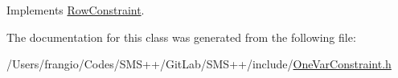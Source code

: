 Implements \mbox{\hyperlink{class_s_m_spp__di__unipi__it_1_1_row_constraint_a1e707449bc5e308a84fbb17197e184a6}{Row\+Constraint}}.



The documentation for this class was generated from the following file\+:\begin{DoxyCompactItemize}
\item 
/\+Users/frangio/\+Codes/\+S\+M\+S++/\+Git\+Lab/\+S\+M\+S++/include/\mbox{\hyperlink{_one_var_constraint_8h}{One\+Var\+Constraint.\+h}}\end{DoxyCompactItemize}

